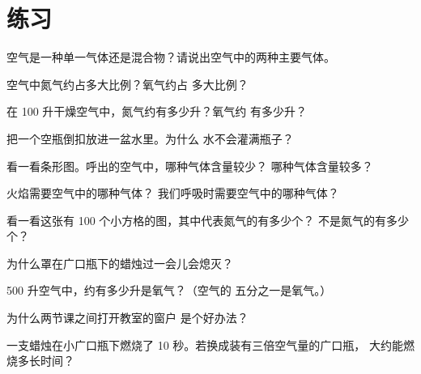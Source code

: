 \section{练习}

\begin{exercise}[$\star$]\label{exo:g4:air-a-mixture-of-gases:1}
空气是一种单一气体还是混合物？请说出空气中的两种主要气体。
\end{exercise}

\begin{exercise}[$\star$]\label{exo:g4:air-a-mixture-of-gases:2}
空气中氮气约占多大比例？氧气约占
多大比例？
\end{exercise}

\begin{exercise}[$\star$]\label{exo:g4:air-a-mixture-of-gases:3}
在 100 升干燥空气中，氮气约有多少升？氧气约
有多少升？
\end{exercise}

\begin{exercise}[$\star$]\label{exo:g4:air-a-mixture-of-gases:4}
把一个空瓶倒扣放进一盆水里。为什么
水不会灌满瓶子？
\end{exercise}

\begin{exercise}[$\star$]\label{exo:g4:air-a-mixture-of-gases:5}
看一看条形图。呼出的空气中，哪种气体含量较少？
哪种气体含量较多？
\end{exercise}

\begin{exercise}[$\star$]\label{exo:g4:air-a-mixture-of-gases:6}
火焰需要空气中的哪种气体？
我们呼吸时需要空气中的哪种气体？
\end{exercise}

\begin{exercise}[$\star$]\label{exo:g4:air-a-mixture-of-gases:7}
看一看这张有 100 个小方格的图，其中代表氮气的有多少个？
不是氮气的有多少个？
\end{exercise}

\begin{exercise}[$\star$]\label{exo:g4:air-a-mixture-of-gases:8}
为什么罩在广口瓶下的蜡烛过一会儿会熄灭？
\end{exercise}

\begin{exercise}[$\star$]\label{exo:g4:air-a-mixture-of-gases:9}
500 升空气中，约有多少升是氧气？（空气的
五分之一是氧气。）
\end{exercise}

\begin{exercise}[$\star\star$]\label{exo:g4:air-a-mixture-of-gases:10}
为什么两节课之间打开教室的窗户
是个好办法？
\end{exercise}

\begin{exercise}[$\star\star$]\label{exo:g4:air-a-mixture-of-gases:11}
一支蜡烛在小广口瓶下燃烧了 10 秒。若换成装有三倍空气量的广口瓶，
大约能燃烧多长时间？
\end{exercise}
